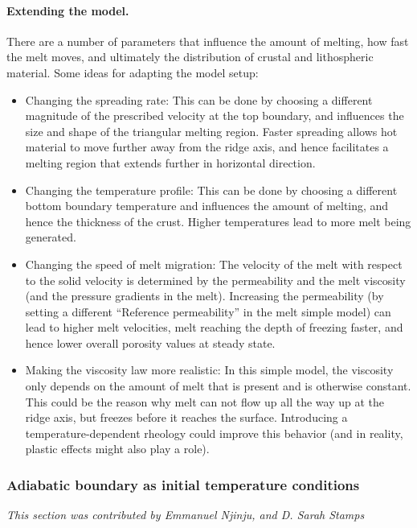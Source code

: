 \documentclass{article}
\begin{document}
\paragraph{Extending the model.}
There are a number of parameters that influence the amount of melting, how fast the melt moves, and ultimately the distribution of crustal and lithospheric material. 
Some ideas for adapting the model setup:
\begin{itemize}
  \item Changing the spreading rate: This can be done by choosing a different magnitude of the 
        prescribed velocity at the top boundary, and influences the size and shape of the triangular
        melting region. Faster spreading allows hot material to move further away from the ridge axis, 
        and hence facilitates a melting region that extends further in horizontal direction. 
  \item Changing the temperature profile: This can be done by choosing a different bottom boundary 
        temperature and influences the amount of melting, and hence the thickness of the crust. 
        Higher temperatures lead to more melt being generated. 
  \item Changing the speed of melt migration: The velocity of the melt with respect to the solid velocity 
        is determined by the permeability and the melt viscosity (and the pressure gradients in the melt). 
        Increasing the permeability (by setting a different ``Reference permeability'' in the melt simple 
        model) can lead to higher melt velocities, melt reaching the depth of freezing faster, and hence 
        lower overall porosity values at steady state. 
  \item Making the viscosity law more realistic: In this simple model, the viscosity only depends on the 
        amount of melt that is present and is otherwise constant. This could be the reason why melt can 
        not flow up all the way up at the ridge axis, but freezes before it reaches the surface. 
        Introducing a temperature-dependent rheology could improve this behavior (and in reality, plastic
        effects might also play a role).
\end{itemize}

\subsubsection{Adiabatic boundary as initial temperature conditions}
\textit{This section was contributed by Emmanuel Njinju, and D. Sarah Stamps}
\end{document}
